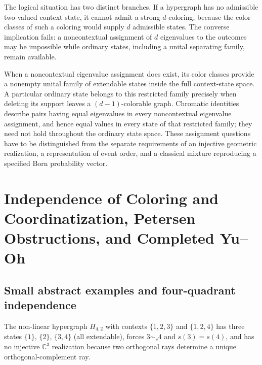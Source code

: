 \documentclass[aps,pra,reprint,superscriptaddress,longbibliography,nofootinbib,floatfix,10pt]{revtex4-2}
\theoremstyle{definition}\newtheorem{definition}[theorem]{Definition}
\theoremstyle{remark}\newtheorem{remark}[theorem]{Remark}
\newcommand{\C}{\mathbb C}\newcommand{\R}{\mathbb R}\newcommand{\Q}{\mathbb Q}
\begin{document}
The logical situation has two distinct branches. If a hypergraph has no admissible two-valued context state, it cannot admit a strong $d$-coloring, because the color classes of such a coloring would supply $d$ admissible states. The converse implication fails: a noncontextual assignment of $d$ eigenvalues to the outcomes may be impossible while ordinary states, including a unital separating family, remain available.

When a noncontextual eigenvalue assignment does exist, its color classes provide a nonempty unital family of extendable states inside the full context-state space. A particular ordinary state belongs to this restricted family precisely when deleting its support leaves a $(d-1)$-colorable graph. Chromatic identities describe pairs having equal eigenvalues in every noncontextual eigenvalue assignment, and hence equal values in every state of that restricted family; they need not hold throughout the ordinary state space. These assignment questions have to be distinguished from the separate requirements of an injective geometric realization, a representation of event order, and a classical mixture reproducing a specified Born probability vector.

\section{Independence of Coloring and Coordinatization, Petersen Obstructions, and Completed Yu--Oh}\label{sec:independence}

\subsection{Small abstract examples and four-quadrant independence}

The non-linear hypergraph $H_{4,2}$ with contexts $\{1,2,3\}$ and $\{1,2,4\}$ has three states $\{1\}$, $\{2\}$, $\{3,4\}$ (all extendable), forces $3\sim_c 4$ and $s(3)=s(4)$, and has no injective $\C^3$ realization because two orthogonal rays determine a unique orthogonal-complement ray.
\end{document}
